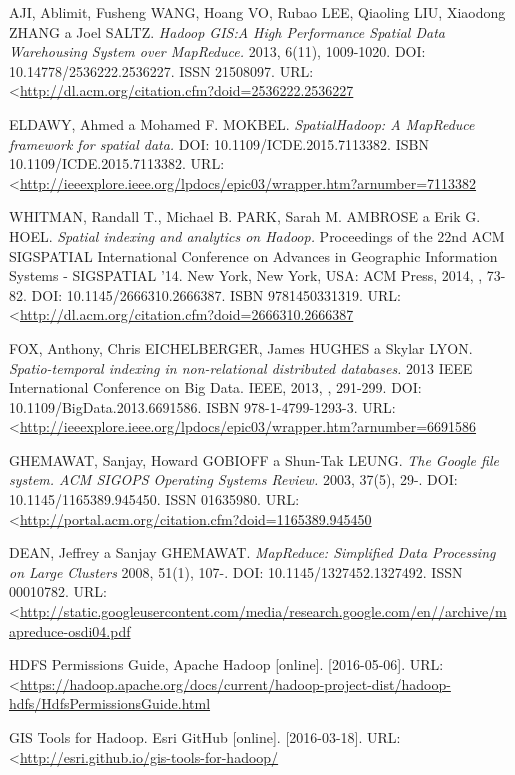 \documentclass[a4paper,12pt,oneside]{report}
\begin{document}
\begin{thebibliography}{99}
AJI, Ablimit, Fusheng WANG, Hoang VO, Rubao LEE, Qiaoling LIU, Xiaodong ZHANG a Joel SALTZ. \textit{Hadoop GIS:A High Performance Spatial Data Warehousing System over MapReduce.} 2013, 6(11), 1009-1020. DOI: 10.14778/2536222.2536227. ISSN 21508097.  URL:  \textless\url{http://dl.acm.org/citation.cfm?doid=2536222.2536227}

ELDAWY, Ahmed a Mohamed F. MOKBEL. \textit{SpatialHadoop: A MapReduce framework for spatial data.} DOI: 10.1109/ICDE.2015.7113382. ISBN 10.1109/ICDE.2015.7113382. URL:  \textless\url{http://ieeexplore.ieee.org/lpdocs/epic03/wrapper.htm?arnumber=7113382}

WHITMAN, Randall T., Michael B. PARK, Sarah M. AMBROSE a Erik G. HOEL. \textit{Spatial indexing and analytics on Hadoop.} Proceedings of the 22nd ACM SIGSPATIAL International Conference on Advances in Geographic Information Systems - SIGSPATIAL '14. New York, New York, USA: ACM Press, 2014, , 73-82. DOI: 10.1145/2666310.2666387. ISBN 9781450331319. URL:  \textless\url{http://dl.acm.org/citation.cfm?doid=2666310.2666387}

FOX, Anthony, Chris EICHELBERGER, James HUGHES a Skylar LYON. \textit{Spatio-temporal indexing in non-relational distributed databases.} 2013 IEEE International Conference on Big Data. IEEE, 2013, , 291-299. DOI: 10.1109/BigData.2013.6691586. ISBN 978-1-4799-1293-3. URL:  \textless\url{http://ieeexplore.ieee.org/lpdocs/epic03/wrapper.htm?arnumber=6691586}

GHEMAWAT, Sanjay, Howard GOBIOFF a Shun-Tak LEUNG. \textit{The Google file system. ACM SIGOPS Operating Systems Review.} 2003, 37(5), 29-. DOI: 10.1145/1165389.945450. ISSN 01635980.  URL:  \textless\url{http://portal.acm.org/citation.cfm?doid=1165389.945450}

DEAN, Jeffrey a Sanjay GHEMAWAT. \textit{MapReduce: Simplified Data Processing on Large Clusters}  2008, 51(1), 107-. DOI: 10.1145/1327452.1327492. ISSN 00010782. URL:  \textless\url{http://static.googleusercontent.com/media/research.google.com/en//archive/mapreduce-osdi04.pdf}



HDFS Permissions Guide, Apache Hadoop  [online]. [2016-05-06]. URL:  \textless\url{https://hadoop.apache.org/docs/current/hadoop-project-dist/hadoop-hdfs/HdfsPermissionsGuide.html}

GIS Tools for Hadoop. Esri GitHub [online]. [2016-03-18]. URL:  \textless\url{http://esri.github.io/gis-tools-for-hadoop/}


\end{thebibliography}
\end{document}
